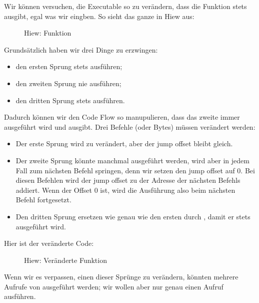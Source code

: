 



\clearpage
{}
Wir können versuchen, die Executable so zu verändern, dass die Funktion  stets  ausgibt, egal
was wir eingben.
So sieht das ganze in Hiew aus:
\begin{figure}[H]
\centering
{}
\caption{Hiew: Funktion }
\label{fig:jcc_hiew_1}
\end{figure}
Grundsätzlich haben wir drei Dinge zu erzwingen:
\begin{itemize}
  \item den ersten Sprung stets ausführen;
  \item den zweiten Sprung nie ausführen;
  \item den dritten Sprung stets ausführen.
\end{itemize}

Dadurch können wir den Code Flow so manupulieren, dass das zweite \printf immer ausgeführt wird und  ausgibt.
Drei Befehle (oder Bytes) müssen verändert werden:
\begin{itemize}
\item Der erste Sprung wird zu \JMP verändert, aber der \gls{jump offset} bleibt gleich.

 
\item Der zweite Sprung könnte manchmal ausgeführt werden, wird aber in jedem Fall zum nächsten Befehl springen, denn
wir setzen den \gls{jump offset} auf 0.
Bei diesen Befehlen wird der \gls{jump offset} zu der Adresse der nächsten Befehls addiert. Wenn der Offset 0 ist, wird
die Ausführung also beim nächsten Befehl fortgesetzt.
\item 
Den dritten Sprung ersetzen wie genau wie den ersten durch \JMP, damit er stets ausgeführt wird.

\end{itemize}

\clearpage
Hier ist der veränderte Code:

\begin{figure}[H]
\centering
{}
\caption{Hiew: Veränderte Funktion }
\label{fig:jcc_hiew_2}
\end{figure}
Wenn wir es verpassen, einen dieser Sprünge zu verändern, könnten mehrere Aufrufe von \printf ausgeführt werden; wir
wollen aber nur genau einen Aufruf ausführen.

